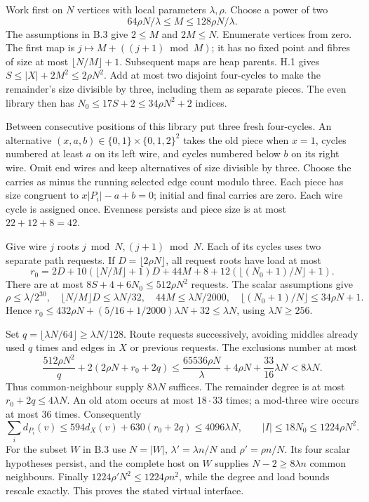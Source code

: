 \documentclass[english,11pt,a4paper]{article}
\begin{document}
Work first on \(N\) vertices with local parameters \(\lambda,\rho\). Choose a power of two \[64\rho N/\lambda\le M\le128\rho N/\lambda.\] The assumptions in B.3 give \(2\le M\) and \(2M\le N\). Enumerate vertices from zero. The first map is \(j\mapsto M+((j+1)\bmod M)\); it has no fixed point and fibres of size at most \(\lfloor N/M\rfloor+1\). Subsequent maps are heap parents. H.1 gives \(S\le|X|+2M^2\le2\rho N^2\). Add at most two disjoint four-cycles to make the remainder's size divisible by three, including them as separate pieces. The even library then has \(N_0\le17S+2\le34\rho N^2+2\) indices.

Between consecutive positions of this library put three fresh four-cycles. An alternative \((x,a,b)\in\{0,1\}\times\{0,1,2\}^2\) takes the old piece when \(x=1\), cycles numbered at least \(a\) on its left wire, and cycles numbered below \(b\) on its right wire. Omit end wires and keep alternatives of size divisible by three. Choose the carries as minus the running selected edge count modulo three. Each piece has size congruent to \(x|P_i|-a+b=0\); initial and final carries are zero. Each wire cycle is assigned once. Evenness persists and piece size is at most \(22+12+8=42\).

Give wire \(j\) roots \(j\bmod N,(j+1)\bmod N\). Each of its cycles uses two separate path requests. If \(D=\lfloor2\rho N\rfloor\), all request roots have load at most \[r_0=2D+10(\lfloor N/M\rfloor+1)D+44M+8
+12(\lfloor(N_0+1)/N\rfloor+1).\] There are at most \(8S+4+6N_0\le512\rho N^2\) requests. The scalar assumptions give \[\rho\le\lambda/2^{30},\quad
\lfloor N/M\rfloor D\le\lambda N/32,\quad
44M\le\lambda N/2000,\quad
\lfloor(N_0+1)/N\rfloor\le34\rho N+1.\] Hence \(r_0\le432\rho N+(5/16+1/2000)\lambda N+32\le\lambda N\), using \(\lambda N\ge256\).

Set \(q=\lfloor\lambda N/64\rfloor\ge\lambda N/128\). Route requests successively, avoiding middles already used \(q\) times and edges in \(X\) or previous requests. The exclusions number at most \[\frac{512\rho N^2}{q}+2(2\rho N+r_0+2q)
\le\frac{65536\rho N}{\lambda}+4\rho N+\frac{33}{16}\lambda N
<8\lambda N.\] Thus common-neighbour supply \(8\lambda N\) suffices. The remainder degree is at most \(r_0+2q\le4\lambda N\). An old atom occurs at most \(18\cdot33\) times; a mod-three wire occurs at most \(36\) times. Consequently \[\sum_i d_{P_i}(v)\le594d_X(v)+630(r_0+2q)\le4096\lambda N,
\qquad |I|\le18N_0\le1224\rho N^2.\] For the subset \(W\) in B.3 use \(N=|W|\), \(\lambda'=\lambda n/N\) and \(\rho'=\rho n/N\). Its four scalar hypotheses persist, and the complete host on \(W\) supplies \(N-2\ge8\lambda n\) common neighbours. Finally \(1224\rho'N^2\le1224\rho n^2\), while the degree and load bounds rescale exactly. This proves the stated virtual interface.
\end{document}
